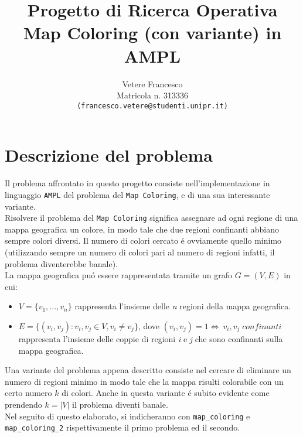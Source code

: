 \documentclass{article}
\title{\textbf{Progetto di Ricerca Operativa} \\
	\large \textbf{Map Coloring (con variante) in AMPL} \\
}
\author{Vetere Francesco\\ Matricola n. 313336 \\ \texttt{(francesco.vetere@studenti.unipr.it)}}
\date{}
\begin{document}
\maketitle
\tableofcontents

\pagebreak

\section{Descrizione del problema} 

Il problema affrontato in questo progetto consiste nell'implementazione in linguaggio \texttt{AMPL} del problema del \texttt{Map Coloring}, e di una sua interessante variante.\\
Risolvere il problema del \texttt{Map Coloring} significa assegnare ad ogni regione di una mappa geografica un colore, in modo tale che due regioni confinanti abbiano sempre colori diversi. Il numero di colori cercato \'e ovviamente quello minimo (utilizzando sempre un numero di colori pari al numero di regioni infatti, il problema diventerebbe banale).\\
La mappa geografica pu\'o essere rappresentata tramite un grafo $G = (V, E)$ in cui:
\begin{itemize}
\item $V=\{v_{1},...,v_{n}\}$ rappresenta l'insieme delle \emph{n} regioni della mappa geografica.
\item $E=\{(v_{i}, v_{j}) : v_{i}, v_{j} \in V, v_{i} \neq v_{j}\}$, dove $ (v_{i}, v_{j}) = 1 \iff \: v_{i}, v_{j} \; confinanti$ rappresenta l'insieme delle coppie di regioni \emph{i} e \emph{j} che sono confinanti sulla mappa geografica.
\end{itemize}

Una variante del problema appena descritto consiste nel cercare di eliminare un numero di regioni minimo in modo tale che la mappa risulti colorabile con un certo numero $k$ di colori. Anche in questa variante \'e subito evidente come prendendo $k = |V|$ il problema diventi banale.\\

Nel seguito di questo elaborato, si indicheranno con \texttt{map\_coloring} e \texttt{map\_coloring\_2} rispettivamente il primo problema ed il secondo.
\pagebreak
\end{document}
